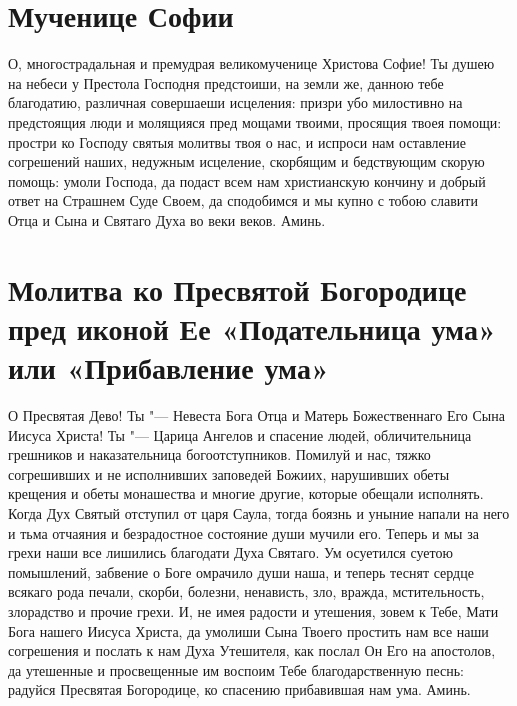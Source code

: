 \bigskip\bigskip\mychapterending


 

\section{Мученице Софии}
 


О, многострадальная и премудрая великомученице Христова Софие! Ты душею на небеси у Престола Господня предстоиши, на земли же, данною тебе благодатию, различная совершаеши исцеления: призри убо милостивно на предстоящия люди и молящияся пред мощами твоими, просящия твоея помощи: простри ко Господу святыя молитвы твоя о нас, и испроси нам оставление согрешений наших, недужным исцеление, скорбящим и бедствующим скорую помощь: умоли Господа, да подаст всем нам христианскую кончину и добрый ответ на Страшнем Суде Своем, да сподобимся и мы купно с тобою славити Отца и Сына и Святаго Духа во веки веков. Аминь.


\bigskip\bigskip\mychapterending


 

\section{Молитва ко Пресвятой Богородице пред иконой Ее «Подательница ума» или «Прибавление ума»}
 

О Пресвятая Дево! Ты "--- Невеста Бога Отца и Матерь Божественнаго Его Сына Иисуса Христа! Ты "--- Царица Ангелов и спасение людей, обличительница грешников и наказательница богоотступников. Помилуй и нас, тяжко согрешивших и не исполнивших заповедей Божиих, нарушивших обеты крещения и обеты монашества и многие другие, которые обещали исполнять. Когда Дух Святый отступил от царя Саула, тогда боязнь и уныние напали на него и тьма отчаяния и безрадостное состояние души мучили его. Теперь и мы за грехи наши все лишились благодати Духа Святаго. Ум осуетился суетою помышлений, забвение о Боге омрачило души наша, и теперь теснят сердце всякаго рода печали, скорби, болезни, ненависть, зло, вражда, мстительность, злорадство и прочие грехи. И, не имея радости и утешения, зовем к Тебе, Мати Бога нашего Иисуса Христа, да умолиши Сына Твоего простить нам все наши согрешения и послать к нам Духа Утешителя, как послал Он Его на апостолов, да утешенные и просвещенные им воспоим Тебе благодарственную песнь: радуйся Пресвятая Богородице, ко спасению прибавившая нам ума. Аминь.


